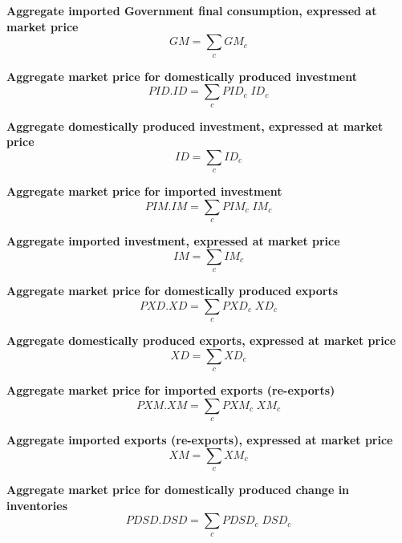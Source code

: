 \documentclass[12pt]{article}
\numberwithin{equation}{section}
\begin{document}
\noindent \textbf{Aggregate imported Government final consumption, expressed at market price} 
\begin{dmath}
GM = \sum_{c} GM_{c}
\label{SU.mdlGM}
\end{dmath}

\noindent \textbf{Aggregate market price for domestically produced investment} 
\begin{dmath}
PID . ID = \sum_{c} PID_{c} \; ID_{c}
\label{SU.mdlPID}
\end{dmath}

\noindent \textbf{Aggregate domestically produced investment, expressed at market price} 
\begin{dmath}
ID = \sum_{c} ID_{c}
\label{SU.mdlID}
\end{dmath}

\noindent \textbf{Aggregate market price for imported investment} 
\begin{dmath}
PIM . IM = \sum_{c} PIM_{c} \; IM_{c}
\label{SU.mdlPIM}
\end{dmath}

\noindent \textbf{Aggregate imported investment, expressed at market price} 
\begin{dmath}
IM = \sum_{c} IM_{c}
\label{SU.mdlIM}
\end{dmath}

\noindent \textbf{Aggregate market price for domestically produced exports} 
\begin{dmath}
PXD . XD = \sum_{c} PXD_{c} \; XD_{c}
\label{SU.mdlPXD}
\end{dmath}

\noindent \textbf{Aggregate domestically produced exports, expressed at market price} 
\begin{dmath}
XD = \sum_{c} XD_{c}
\label{SU.mdlXD}
\end{dmath}

\noindent \textbf{Aggregate market price for imported exports (re-exports)} 
\begin{dmath}
PXM . XM = \sum_{c} PXM_{c} \; XM_{c}
\label{SU.mdlPXM}
\end{dmath}

\noindent \textbf{Aggregate imported exports (re-exports), expressed at market price} 
\begin{dmath}
XM = \sum_{c} XM_{c}
\label{SU.mdlXM}
\end{dmath}

\noindent \textbf{Aggregate market price for domestically produced change in inventories} 
\begin{dmath}
PDSD . DSD = \sum_{c} PDSD_{c} \; DSD_{c}
\label{SU.mdlPDSD}
\end{dmath}
\end{document}
